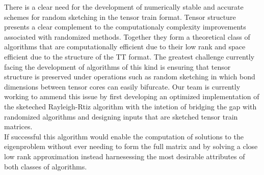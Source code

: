 \documentclass[%
 aip,12pt
 amsmath,amssymb,
 reprint,%
]{revtex4-1}
\begin{document}
There is a clear need for the development of numerically stable and accurate schemes for random sketching in the tensor train format. Tensor structure presents a clear complement to the computationaly complexity improvements associated with randomized methods. Together they form a theoretical class of algorithms that are computationally efficient due to their low rank and space efficient due to the structure of the TT format. The greatest challenge currently facing the development of algorithms of this kind is ensuring that tensor structure is preserved under operations such as random sketching in which bond dimensions between tensor cores can easily bifurcate. Our team is currently working to ammend this issue by first developing an optimized implementation of the sketeched Rayleigh-Rtiz algorithm with the intetion of bridging the gap with randomized algorithms and designing inputs that are sketched tensor train matrices.\\
If successful this algorithm would enable the computation of solutions to the eigenproblem without ever needing to form the full matrix and by solving a close low rank approximation instead harnesessing the most desirable attributes of both classes of algorithms.
\end{document}
